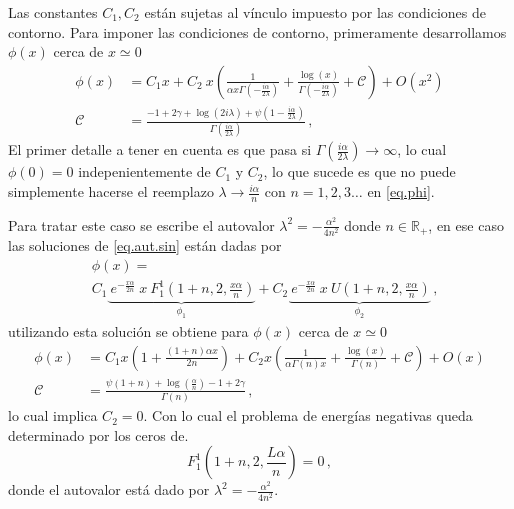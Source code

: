 Las constantes $C_1,C_2$ están sujetas al vínculo impuesto por las condiciones de contorno.
Para imponer las condiciones de contorno, primeramente desarrollamos $\phi (x)$ cerca de $x \simeq 0$ 
\begin{align}
\phi  ( x ) &=
C _1  x  + 
C _2 \ x 
\left( 
\frac{1}{  \alpha x  \Gamma ( - \frac{i \alpha}{2  \lambda}  )   }  +
\frac{\log (x) }{\Gamma ( - \frac{ i \alpha}{2 \lambda} ) } + \mathscr{C} \right) + O(x ^2)
	\nonumber
\\[10pt]
\mathscr{C} &= 
\frac{
-1 + 2 \gamma + \log ( 2  i \lambda ) + \psi (1 - \frac{i \alpha}{2 \lambda})
}
{\Gamma (\frac{i \alpha}{2 \lambda})}
\, ,
\label{eq.scat}
\end{align}
El primer detalle a tener en cuenta es que pasa si $\Gamma ( \frac{i \alpha}{2 \lambda}  ) \rightarrow \infty$, lo cual $\phi (0) = 0$ indepenientemente de $C _1$ y $C _2$, lo que sucede es que no puede simplemente hacerse el reemplazo $\lambda \rightarrow  \frac{i \alpha }{ n } $ con $n=1,2,3 \dots$ en \eqref{eq.phi}. 

Para tratar este caso se escribe el autovalor $\lambda ^2 = - \frac{\alpha ^2}{4 n ^2}$ donde $n \in \mathbb{R _+}$, en ese caso las soluciones de \eqref{eq.aut.sin} están dadas por
\begin{align}
& \nonumber 
	\phi (x)     =
\\ &        
	    C _1
    	\underbrace{
				     \ e ^{- \frac{x \alpha}{2n}} \ x \ 
				     F _{1} ^{1}
				     \left( 1+n,2, \frac{x \alpha}{n} \right) 
				     } _ {\phi_1} 				     
				     + 
      C _2 
      \underbrace{ 
      			   \ e^{- \frac{x \alpha}{2n}} \ x \ 
      			   U 
      			   \left( 1+n,2, \frac{x \alpha}{n} \right)
      			   } _{\phi_2} 
    \, ,
\label{eq.phi.2}
\end{align}
utilizando esta solución se obtiene para $\phi (x) $ cerca de $x \simeq 0$ 
\begin{align}
\nonumber
	\phi (x) 
&=
	C _1 x 
	\left(1 + \frac{(1+n) \alpha x}{2 n } \right)
	+ C _2 x
	\left(
	\frac{1}{\alpha \Gamma (n) x } + \frac{\log (x)}{\Gamma (n)} +\mathscr{C}
	\right)
	+ O(x)
\\
\mathscr{C} 
&=
\frac{\psi (1+n) + \log \left( \frac{\alpha}{n} \right) -1 + 2 \gamma}{\Gamma (n)}
\, ,
\end{align}
lo cual implica $C _2 = 0$. Con lo cual el problema de energías negativas queda determinado por los ceros de.
\begin{equation}
	F _1 ^1 
	\left(
		1+n,2, \frac{L \alpha}{n}
		\right) = 0
\, ,		
\end{equation}
donde el autovalor está dado por $\lambda ^2 = - \frac{\alpha ^2}{4 n ^2}$.


